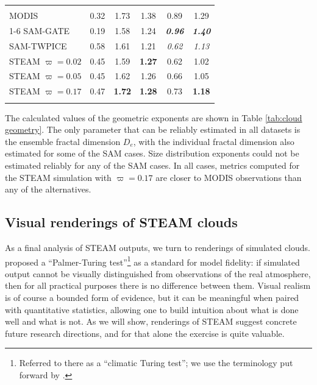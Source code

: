\documentclass[acp, manuscript, english]{copernicus}
\begin{document}
\begin{table}[t]
\begin{tabular}{lccccc}
\middlehline
\multicolumn{6}{l}{\textbf{$R > 0.3$}} \\
MODIS & 0.32 & 1.73 & 1.38 & 0.89 & 1.29 \\
\cline{1-6}
SAM-GATE & {0.19} & 1.58 & 1.24 & \textbf{\textit{0.96}} & \textbf{\textit{1.40}} \\
SAM-TWPICE & 0.58 & 1.61 & 1.21 & \textit{0.62} & \textit{1.13} \\
STEAM $\varpi = 0.02$ & {0.45} & 1.59 & \textbf{1.27} & 0.62 & 1.02 \\
STEAM $\varpi = 0.05$ & {0.45} & 1.62 & 1.26 & 0.66 & 1.05 \\
STEAM $\varpi = 0.17$ & 0.47 & \textbf{1.72} & \textbf{1.28} & 0.73 & \textbf{1.18} \\
\bottomhline
\end{tabular}
\belowtable{}
\end{table}



The calculated values of the geometric exponents are shown in Table \ref{tab:cloud geometry}. The only parameter that can be reliably estimated in all datasets is the ensemble fractal dimension $D_e$, with the individual fractal dimension also estimated for some of the SAM cases. Size distribution exponents could not be estimated reliably for any of the SAM cases. In all cases, metrics computed for the STEAM simulation with $\varpi=0.17$ are closer to MODIS observations than any of the alternatives. 

\subsection{Visual renderings of STEAM clouds} \label{sect:visual renderings}

As a final analysis of STEAM outputs, we turn to renderings of simulated clouds. \citet{palmer2016} proposed a ``Palmer-Turing test''\footnote{Referred to there as a ``climatic Turing test''; we use the terminology put forward by \citet{christensen2021}.} as a standard for model fidelity: if simulated output cannot be visually distinguished from observations of the real atmosphere, then for all practical purposes there is no difference between them. Visual realism is of course a bounded form of evidence, but it can be meaningful when paired with quantitative statistics, allowing one to build intuition about what is done well and what is not. As we will show, renderings of STEAM suggest concrete future research directions, and for that alone the exercise is quite valuable.
\end{document}
